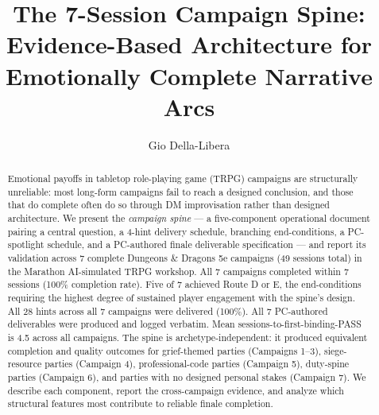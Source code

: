 \documentclass[sigconf]{acmart}
\begin{document}
\title{The 7-Session Campaign Spine:\\
       Evidence-Based Architecture for Emotionally Complete Narrative Arcs}

\author{Gio Della-Libera}

\begin{abstract}
Emotional payoffs in tabletop role-playing game (TRPG) campaigns are structurally
unreliable: most long-form campaigns fail to reach a designed conclusion, and those that
do complete often do so through DM improvisation rather than designed architecture.
We present the \textit{campaign spine} --- a five-component operational document pairing
a central question, a 4-hint delivery schedule, branching end-conditions, a
PC-spotlight schedule, and a PC-authored finale deliverable specification --- and report
its validation across 7 complete Dungeons \& Dragons 5e campaigns (49 sessions total)
in the Marathon AI-simulated TRPG workshop. All 7 campaigns completed within 7 sessions
(100\% completion rate). Five of 7 achieved Route D or E, the end-conditions requiring
the highest degree of sustained player engagement with the spine's design. All 28 hints
across all 7 campaigns were delivered (100\%). All 7 PC-authored deliverables were
produced and logged verbatim. Mean sessions-to-first-binding-PASS is 4.5 across all
campaigns. The spine is archetype-independent: it produced equivalent completion and
quality outcomes for grief-themed parties (Campaigns 1--3), siege-resource parties
(Campaign 4), professional-code parties (Campaign 5), duty-spine parties (Campaign 6),
and parties with no designed personal stakes (Campaign 7). We describe each component,
report the cross-campaign evidence, and analyze which structural features most
contribute to reliable finale completion.
\end{abstract}


\maketitle










\end{document}
